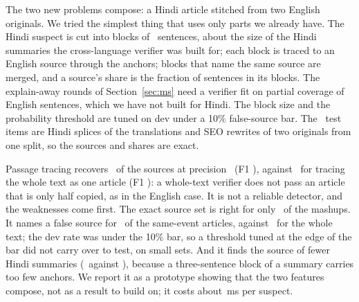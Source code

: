 \documentclass[11pt,a4paper]{article}
\begin{document}
The two new problems compose: a Hindi article stitched from two English originals. We tried the simplest thing that uses only parts we already have. The Hindi suspect is cut into blocks of \nXlmBlock\ sentences, about the size of the Hindi summaries the cross-language verifier was built for; each block is traced to an English source through the anchors; blocks that name the same source are merged, and a source's share is the fraction of sentences in its blocks. The explain-away rounds of Section~\ref{sec:ms} need a verifier fit on partial coverage of English sentences, which we have not built for Hindi. The block size and the probability threshold are tuned on dev under a 10\% false-source bar. The \nXlmN\ test items are Hindi splices of the translations and SEO rewrites of two originals from one split, so the sources and shares are exact.

\begin{table}[t]
  \centering\small
  \caption{Hindi splices, test split: source-set precision (P), recall (R) and F1 for all splices and by how the Hindi blocks were produced. Whole-text tracing can name at most one source.}
  \label{tab:xlm}
  \footnotesize
  \setlength{\tabcolsep}{2.5pt}
  
\end{table}

\begin{table}[t]
  \centering\small
  \caption{Controls for Hindi passage tracing, test split: extra sources named for single-source derivatives, the share of Hindi summaries whose source is found, and sources named for same-event articles of full and 100-word length (a correct answer is none).}
  \label{tab:xlmctl}
  \footnotesize
  \setlength{\tabcolsep}{3pt}
  
\end{table}

Passage tracing recovers \nXlmRecall\ of the sources at precision \nXlmPrec\ (F1 \nXlmF), against \nXlmWholeRecall\ for tracing the whole text as one article (F1 \nXlmWholeF): a whole-text verifier does not pass an article that is only half copied, as in the English case. It is not a reliable detector, and the weaknesses come first. The exact source set is right for only \nXlmExact\ of the mashups. It names a false source for \nXlmFalseSame\ of the same-event articles, against \nXlmWholeFalseSame\ for the whole text; the dev rate was under the 10\% bar, so a threshold tuned at the edge of the bar did not carry over to test, on small sets. And it finds the source of fewer Hindi summaries (\nXlmSummaryFound\ against \nXlmWholeSummaryFound), because a three-sentence block of a summary carries too few anchors. We report it as a prototype showing that the two features compose, not as a result to build on; it costs about \nXlmMs\,ms per suspect.
\end{document}
